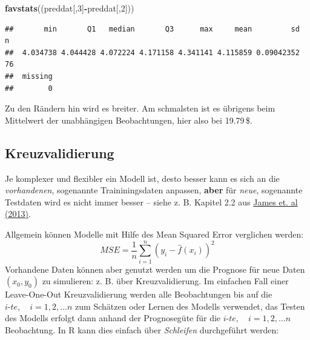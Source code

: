 \documentclass[12pt,ngerman,paper=a4,pagesize,DIV=13]{scrreprt}
\newenvironment{Shaded}{\begin{snugshade}}{\end{snugshade}}
\newcommand{\DecValTok}[1]{\textcolor[rgb]{0.00,0.00,0.81}{#1}}
\newcommand{\KeywordTok}[1]{\textcolor[rgb]{0.13,0.29,0.53}{\textbf{#1}}}
\newcommand{\NormalTok}[1]{#1}
\newcommand{\OperatorTok}[1]{\textcolor[rgb]{0.81,0.36,0.00}{\textbf{#1}}}
\begin{document}
\begin{Shaded}
\begin{Highlighting}[]
\KeywordTok{favstats}\NormalTok{((preddat[,}\DecValTok{3}\NormalTok{]}\OperatorTok{-}\NormalTok{preddat[,}\DecValTok{2}\NormalTok{]))}
\end{Highlighting}
\end{Shaded}

\begin{verbatim}
##       min       Q1   median       Q3      max     mean         sd  n
##  4.034738 4.044428 4.072224 4.171158 4.341141 4.115859 0.09042352 76
##  missing
##        0
\end{verbatim}

Zu den Rändern hin wird es breiter. Am schmalsten ist es übrigens beim
Mittelwert der unabhängigen Beobachtungen, hier also bei 19.79\(\,\)\$.

\hypertarget{kreuzvalidierung}{%
\subsection{Kreuzvalidierung}\label{kreuzvalidierung}}

Je komplexer und flexibler ein Modell ist, desto besser kann es sich an
die \emph{vorhandenen}, sogenannte Traininingsdaten anpassen,
\textbf{aber} für \emph{neue}, sogenannte Testdaten wird es nicht immer
besser -- siehe z. B. Kapitel 2.2 aus
\href{http://www-bcf.usc.edu/~gareth/ISL/}{James et. al (2013)}.

Allgemein können Modelle mit Hilfe des Mean Squared Error verglichen
werden: \[ MSE = \frac{1}{n} \sum_{i=1}^n (y_i - \hat{f}(x_i))^2\]
Vorhandene Daten können aber genutzt werden um die Prognose für neue
Daten \((x_0,y_0)\) zu simulieren: z. B. über Kreuzvalidierung. Im
einfachen Fall einer Leave-One-Out Kreuzvalidierung werden alle
Beobachtungen bis auf die \(i\text{-}te, \quad i=1,2,\ldots n\) zum
Schätzen oder Lernen des Modells verwendet, das Testen des Modells
erfolgt dann anhand der Prognosegüte für die
\(i\text{-}te, \quad i=1,2,\ldots n\) Beobachtung. In R kann dies
einfach über \emph{Schleifen} durchgeführt werden:
\end{document}

